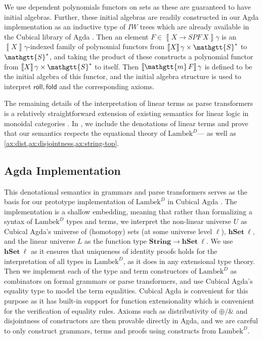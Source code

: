 \documentclass[acmsmall,nonacm]{acmart}
\renewcommand{\Sigma}{\mathgtt{S}}
\renewcommand{\mu}{\mathgtt{m}}
\newcommand{\SPF}{SPF}
\newcommand{\roll}{\mathsf{roll}}
\newcommand{\fold}{\mathsf{fold}}
\newcommand{\sem}[1]{\left\llbracket{#1}\right\rrbracket}
\newcommand{\StringSem}{\mathbf{String}}
\newcommand{\hSet}{\mathbf{hSet}}
\newcommand{\theoryabbv}{$\textrm{Lambek}^D$\xspace}
\newcommand{\agdalogo}{%
  \usebox{\logoagdabox}}%
\newcommand{\zenodolink}{https://zenodo.org/records/15049780}
\newcommand{\Agda}{\href{\zenodolink}{\agdalogo}}
\begin{document}
{We use dependent polynomials functors on sets as these are guaranteed
to have initial algebras. Further, these initial algebras are readily
constructed in our Agda implementation as an inductive type of $IW$
trees which are already available in the Cubical library of Agda
\cite{The_Agda_Community_Cubical_Agda_Library_2024}.  Then an element $F \in \sem{X \to
  \SPF\,X}\gamma$ is an $\sem{X}\gamma$-indexed family of polynomial
functors from $\sem{X}\gamma\times \Sigma^*$ to $\Sigma^*$, and taking
the product of these constructs a polynomial functor from
$\sem{X}\gamma\times \Sigma^*$ to itself. Then $\sem{\mu\,F}\gamma$ is
defined to be the initial algebra of this functor, and the initial
algebra structure is used to interpret $\roll, \fold$ and the
corresponding axioms.

The remaining details of the interpretation of linear terms as parse
transformers is a relatively straightforward extension of existing semantics for
linear logic in monoidal categories \cite{seely89}. In
\fi, we include the denotations
of linear terms and prove that our semantics respects the equational theory of
\theoryabbv --- as well as \cref{ax:dist,ax:disjointness,ax:string-top}.

\subsection{Agda Implementation \Agda}
\label{subsec:impl}
This denotational semantics in grammars and parse transformers serves
as the basis for our prototype implementation of \theoryabbv in
Cubical Agda \cite{schaefer_2025_15243560}. The implementation is a shallow embedding, meaning that
rather than formalizing a syntax of \theoryabbv types and terms, we interpret
the non-linear universe $U$ as Cubical Agda's universe of (homotopy) sets (at
some universe level $\ell$), $\hSet~\ell$, and the linear universe $L$ as the
function type
$\StringSem \to \hSet~\ell$. We use $\hSet~\ell$ as it ensures that uniqueness of identity proofs holds for the interpretation of all types in \theoryabbv, as it does in any extensional type theory. Then we implement each of the type and
term constructors of \theoryabbv as combinators on formal grammars or
parse transformers, and use Cubical Agda's equality type to model the
term equalities. Cubical Agda is convenient for this purpose as it has
built-in support for function extensionality which is convenient for the verification of equality rules. Axioms such as distributivity of $\oplus/\&$ and
disjointness of constructors are then provable directly in Agda, and
we are careful to only construct grammars, terms and proofs using
constructs from \theoryabbv.

}
\end{document}
